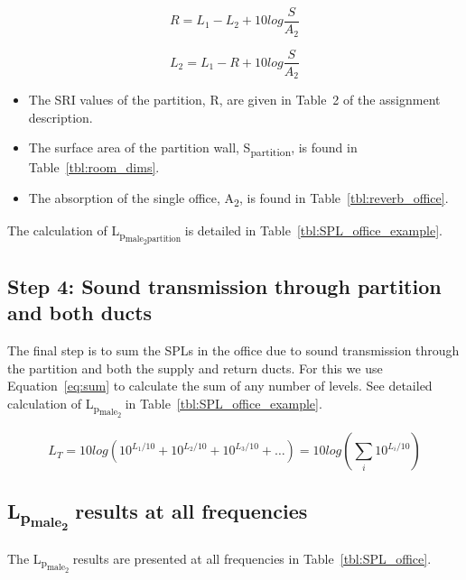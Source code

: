 	\begin{equation}\label{eq:SRI}
		R = L_1 - L_2 + 10 log \frac{S}{A_2}
	\end{equation}
	
	
	\begin{equation}\label{eq:SRI_rearranged}
		L_2 = L_1 - R + 10 log \frac{S}{A_2}
	\end{equation}

\begin{itemize}
	\item The SRI values of the partition, R, are given in Table~2 of the assignment description.
	\item The surface area of the partition wall, S\textsubscript{partition}, is found in Table~\ref{tbl:room_dims}.
	\item The absorption of the single office, A\textsubscript{2}, is found in Table~\ref{tbl:reverb_office}.
\end{itemize}

The calculation of L\textsubscript{p\textsubscript{male\textsubscript{2}partition}} is detailed in Table~\ref{tbl:SPL_office_example}.


\subsection{Step 4: Sound transmission through partition and both ducts}

The final step is to sum the SPLs in the office due to sound transmission through the partition and both the supply and return ducts.
For this we use Equation~\ref{eq:sum} to calculate the sum of any number of levels.
See detailed calculation of L\textsubscript{p\textsubscript{male\textsubscript{2}}} in Table~\ref{tbl:SPL_office_example}.

	\begin{equation}\label{eq:sum}
		L_T = 10 log \left(10^{L_1/10} + 10^{L_2/10} + 10^{L_3/10} + \ldots\right) = 10 log \left(\sum_{i}10^{L_i/10}\right)
	\end{equation}


\subsection{L\textsubscript{p\textsubscript{male\textsubscript{2}}} results at all frequencies}

The L\textsubscript{p\textsubscript{male\textsubscript{2}}} results are presented at all frequencies in Table~\ref{tbl:SPL_office}.





